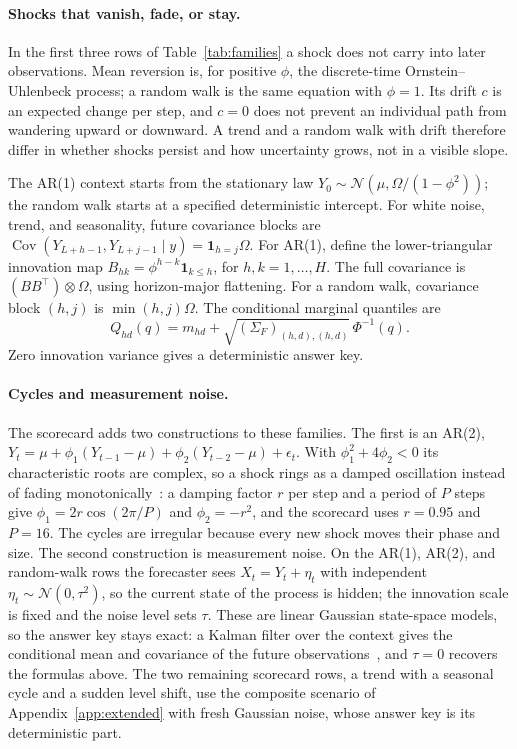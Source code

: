\documentclass[11pt,a4paper]{article}
\newcommand{\Cov}{\operatorname{Cov}}
\begin{document}
\paragraph{Shocks that vanish, fade, or stay.}
In the first three rows of Table~\ref{tab:families} a shock does not carry
into later observations. Mean reversion is, for positive $\phi$, the
discrete-time Ornstein--Uhlenbeck process; a random walk is the same
equation with $\phi=1$. Its drift $c$ is an expected change per step, and
$c=0$ does not prevent an individual path from wandering upward or
downward. A trend and a random walk with drift therefore differ in whether
shocks persist and how uncertainty grows, not in a visible slope.

The AR(1) context starts from the stationary law
$Y_0\sim\mathcal{N}(\mu,\Omega/(1-\phi^2))$; the random walk starts at
a specified deterministic intercept. For white noise, trend, and
seasonality, future covariance blocks are
$\Cov(Y_{L+h-1},Y_{L+j-1}\mid y)=\mathbf{1}_{h=j}\Omega$.
For AR(1), define the lower-triangular innovation map
$B_{hk}=\phi^{h-k}\mathbf{1}_{k\leq h}$, for $h,k=1,\ldots,H$.
The full covariance is $(BB^\top)\otimes\Omega$, using horizon-major
flattening. For a random walk, covariance block $(h,j)$ is
$\min(h,j)\Omega$. The conditional marginal quantiles are
\begin{equation}
 Q_{hd}(q)=m_{hd}+\sqrt{(\Sigma_F)_{(h,d),(h,d)}}\,\Phi^{-1}(q).
\end{equation}
Zero innovation variance gives a deterministic answer key.

\paragraph{Cycles and measurement noise.}
The scorecard adds two constructions to these families. The first is an
AR(2),
$Y_t=\mu+\phi_1(Y_{t-1}-\mu)+\phi_2(Y_{t-2}-\mu)+\epsilon_t$. With
$\phi_1^2+4\phi_2<0$ its characteristic roots are complex, so a shock
rings as a damped oscillation instead of fading
monotonically~\cite{yule1927method}: a damping factor $r$ per step and a
period of $P$ steps give $\phi_1=2r\cos(2\pi/P)$ and $\phi_2=-r^2$, and
the scorecard uses $r=0.95$ and $P=16$. The cycles are irregular because
every new shock moves their phase and size. The second construction is
measurement noise. On the AR(1), AR(2), and random-walk rows the forecaster
sees $X_t=Y_t+\eta_t$ with independent
$\eta_t\sim\mathcal{N}(0,\tau^2)$, so the current state of the process is
hidden; the innovation scale is fixed and the noise level sets $\tau$.
These are linear Gaussian state-space models, so the answer key stays
exact: a Kalman filter over the context gives the conditional mean and
covariance of the future observations~\cite{kalman1960new}, and $\tau=0$
recovers the formulas above. The two remaining scorecard rows, a trend
with a seasonal cycle and a sudden level shift, use the composite scenario
of Appendix~\ref{app:extended} with fresh Gaussian noise, whose answer key
is its deterministic part.
\end{document}
